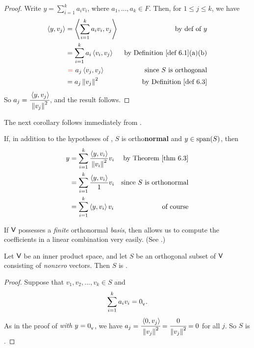 \begin{proof}
Write \(y = \sum_{i = 1}^k a_i v_i\), where \(a_1, ..., a_k \in F\).
Then, for \(1 \le j \le k\), we have
\begin{align*}
    \LG y, v_j \RG & = \LG \sum_{i = 1}^k a_i v_i, v_j \RG & \text{by def of \(y\)} \\
        & = \sum_{i = 1}^k a_i \LG v_i, v_j \RG & \text{by \DEF{6.1}(a)(b)} \\
        & \ \RED{=} \ a_j \LG v_j, v_j \RG & \text{since \(S\) is orthogonal} \\
        & = a_j \norm{v_j}^2 & \text{by \DEF{6.3}}
\end{align*}
So \(a_j = \cfrac{\left< y, v_j \right>}{\left\lVert v_j\right\rVert^2}\), and the result follows.
\end{proof}

The next corollary follows immediately from .

\begin{corollary} \label{corollary 6.3.1}
If, in addition to the hypotheses of , \(S\) is ortho\textbf{normal} and \(y \in \operatorname{span}(S)\), then
\begin{align*}
    y & = \sum_{i = 1}^k \frac{\LG y, v_i \RG}{\norm{v_i}^2} v_i & \text{by \THM{6.3}} \\
      & = \sum_{i = 1}^k \frac{\LG y, v_i \RG}{1} v_i & \text{since \(S\) is orthonormal} \\
      & = \sum_{i = 1}^k \LG y, v_i \RG v_i & \text{of course}
\end{align*}
\end{corollary}

\begin{note}
If \(\textsf{V}\) possesses a \emph{finite} orthonormal \emph{basis}, then  allows us to compute the coefficients in a linear combination very easily.
(See .)
\end{note}

\begin{corollary} \label{corollary 6.3.2}
Let \(\textsf{V}\) be an inner product space, and let \(S\) be an orthogonal subset of \(\textsf{V}\) consisting of \emph{nonzero} vectors.
Then \(S\) is \emph{\LID{}}.
\end{corollary}

\begin{proof}
Suppose that \(v_1, v_2, ..., v_k \in S\) and
\[
    \sum_{i = 1}^k a_i v_i = 0_{_{\textsf{V}}}.
\]
As in the proof of  \emph{with \(y = 0_{_{\textsf{V}}}\)}, we have \(a_j = \cfrac{\left< 0, v_j \right>}{\left\lVert v_j\right\rVert^2} = \cfrac{0}{\left\lVert v_j\right\rVert^2} = 0\) for all \(j\).
So \(S\) is \LID{}.
\end{proof}

